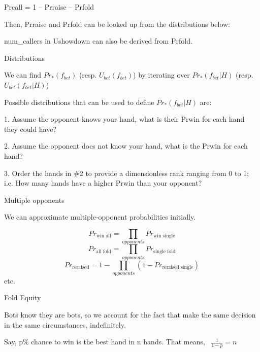 Prcall = 1 -- Prraise -- Prfold

Then, Prraise and Prfold can be looked up from the distributions below:

num\_callers in Ushowdown can also be derived from Prfold.


\bigskip

Distributions

We can find  $\mathit{Pr}_{\text{*}}\left(f_{\mathit{bet}}\right)$ (resp. $U_{\mathit{bet}}\left(f_{\mathit{bet}}\right)$) by iterating over  $\mathit{Pr}_{\text{*}}\left(f_{\mathit{bet}}|H\right)$ (resp.  $U_{\mathit{bet}}\left(f_{\mathit{bet}}|H\right)$) 

Possible distributions that can be used to define  $\mathit{Pr}_{\text{*}}\left(f_{\mathit{bet}}|H\right)$ are:

1. Assume the opponent knows your hand, what is their Prwin for each hand they could have?

2. Assume the opponent does not know your hand, what is the Prwin for each hand?

3. Order the hands in \#2 to provide a dimensionless rank ranging from 0 to 1; i.e. How many hands have a higher Prwin than your opponent?


\bigskip

Multiple opponents

We can approximate multiple-opponent probabilities initially.

\begin{equation*}
\mathit{Pr}_{\text{win all}}=\prod _{\mathit{opponents}}\mathit{Pr}_{\text{win single}}
\end{equation*}
\begin{equation*}
\mathit{Pr}_{\text{all fold}}=\prod _{\mathit{opponents}}\mathit{Pr}_{\text{single fold}}
\end{equation*}
\begin{equation*}
\mathit{Pr}_{\text{reraised}}=1-\prod _{\mathit{opponents}}\left(1-\mathit{Pr}_{\text{reraised single}}\right)
\end{equation*}
etc.


\bigskip

Fold Equity

Bots know they are bots, so we account for the fact that make the same decision in the same circumstances, indefinitely.


\bigskip

Say, p\% chance to win is the best hand in n hands. That means, \  $\frac{1}{1-p}=n$

